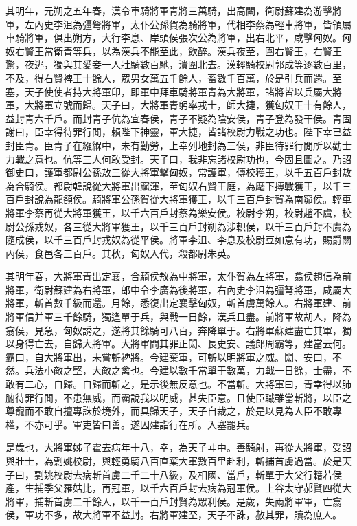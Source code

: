 其明年，元朔之五年春，漢令車騎將軍青將三萬騎，出高闕，衛尉蘇建為游擊將軍，左內史李沮為彊弩將軍，太仆公孫賀為騎將軍，代相李蔡為輕車將軍，皆領屬車騎將軍，俱出朔方，大行李息、岸頭侯張次公為將軍，出右北平，咸擊匈奴。匈奴右賢王當衛青等兵，以為漢兵不能至此，飲醉。漢兵夜至，圍右賢王，右賢王驚，夜逃，獨與其愛妾一人壯騎數百馳，潰圍北去。漢輕騎校尉郭成等逐數百里，不及，得右賢裨王十餘人，眾男女萬五千餘人，畜數千百萬，於是引兵而還。至塞，天子使使者持大將軍印，即軍中拜車騎將軍青為大將軍，諸將皆以兵屬大將軍，大將軍立號而歸。天子曰，大將軍青躬率戎士，師大捷，獲匈奴王十有餘人，益封青六千戶。而封青子伉為宜春侯，青子不疑為陰安侯，青子登為發干侯。青固謝曰，臣幸得待罪行閒，賴陛下神靈，軍大捷，皆諸校尉力戰之功也。陛下幸已益封臣青。臣青子在繦緥中，未有勤勞，上幸列地封為三侯，非臣待罪行閒所以勸士力戰之意也。伉等三人何敢受封。天子曰，我非忘諸校尉功也，今固且圖之。乃詔御史曰，護軍都尉公孫敖三從大將軍擊匈奴，常護軍，傅校獲王，以千五百戶封敖為合騎侯。都尉韓說從大將軍出窳渾，至匈奴右賢王庭，為麾下搏戰獲王，以千三百戶封說為龍頟侯。騎將軍公孫賀從大將軍獲王，以千三百戶封賀為南窌侯。輕車將軍李蔡再從大將軍獲王，以千六百戶封蔡為樂安侯。校尉李朔，校尉趙不虞，校尉公孫戎奴，各三從大將軍獲王，以千三百戶封朔為涉軹侯，以千三百戶封不虞為隨成侯，以千三百戶封戎奴為從平侯。將軍李沮、李息及校尉豆如意有功，賜爵關內侯，食邑各三百戶。其秋，匈奴入代，殺都尉朱英。

其明年春，大將軍青出定襄，合騎侯敖為中將軍，太仆賀為左將軍，翕侯趙信為前將軍，衛尉蘇建為右將軍，郎中令李廣為後將軍，右內史李沮為彊弩將軍，咸屬大將軍，斬首數千級而還。月餘，悉復出定襄擊匈奴，斬首虜萬餘人。右將軍建、前將軍信并軍三千餘騎，獨逢單于兵，與戰一日餘，漢兵且盡。前將軍故胡人，降為翕侯，見急，匈奴誘之，遂將其餘騎可八百，奔降單于。右將軍蘇建盡亡其軍，獨以身得亡去，自歸大將軍。大將軍問其罪正閎、長史安、議郎周霸等，建當云何。霸曰，自大將軍出，未嘗斬裨將。今建棄軍，可斬以明將軍之威。閎、安曰，不然。兵法小敵之堅，大敵之禽也。今建以數千當單于數萬，力戰一日餘，士盡，不敢有二心，自歸。自歸而斬之，是示後無反意也。不當斬。大將軍曰，青幸得以肺腑待罪行閒，不患無威，而霸說我以明威，甚失臣意。且使臣職雖當斬將，以臣之尊寵而不敢自擅專誅於境外，而具歸天子，天子自裁之，於是以見為人臣不敢專權，不亦可乎。軍吏皆曰善。遂囚建詣行在所。入塞罷兵。

是歲也，大將軍姊子霍去病年十八，幸，為天子ヰ中。善騎射，再從大將軍，受詔與壯士，為剽姚校尉，與輕勇騎八百直棄大軍數百里赴利，斬捕首虜過當。於是天子曰，剽姚校尉去病斬首虜二千二十八級，及相國、當戶，斬單于大父行籍若侯產，生捕季父羅姑比，再冠軍，以千六百戶封去病為冠軍侯。上谷太守郝賢四從大將軍，捕斬首虜二千餘人，以千一百戶封賢為眾利侯。是歲，失兩將軍軍，亡翕侯，軍功不多，故大將軍不益封。右將軍建至，天子不誅，赦其罪，贖為庶人。

